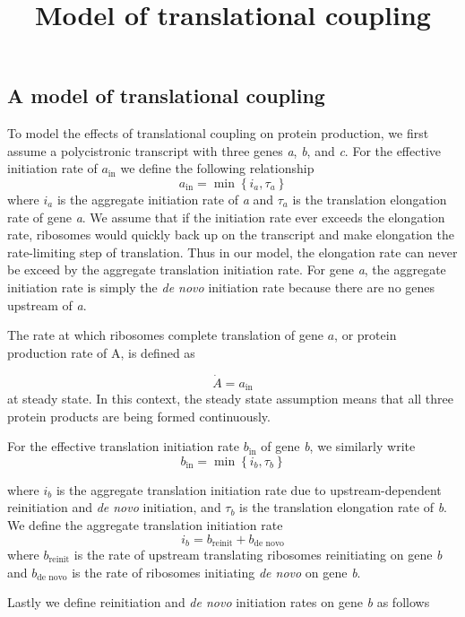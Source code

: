 \documentclass[]{article}
\title{Model of translational coupling}
\author{}
\date{}
\begin{document}
\maketitle

\subsection{A model of translational
coupling}\label{a-model-of-translational-coupling}

To model the effects of translational coupling on protein production, we
first assume a polycistronic transcript with three genes \emph{a},
\emph{b}, and \emph{c}. For the effective initiation rate of
\(a_\text{in}\) we define the following relationship
\[a_\text{in} = \min\left\{i_a, \tau_a\right\}\] where \(i_a\) is the
aggregate initiation rate of \emph{a} and \(\tau_a\) is the translation
elongation rate of gene \emph{a}. We assume that if the initiation rate
ever exceeds the elongation rate, ribosomes would quickly back up on the
transcript and make elongation the rate-limiting step of translation.
Thus in our model, the elongation rate can never be exceed by the
aggregate translation initiation rate. For gene \emph{a}, the aggregate
initiation rate is simply the \emph{de novo} initiation rate because
there are no genes upstream of \emph{a}.

The rate at which ribosomes complete translation of gene \(a\), or
protein production rate of A, is defined as

\[ \dot{A} = a_\text{in} \] at steady state. In this context, the steady
state assumption means that all three protein products are being formed
continuously.

For the effective translation initiation rate \(b_\text{in}\) of gene
\emph{b}, we similarly write
\[b_\text{in} = \min\left\{i_b, \tau_b\right\}\]

where \(i_b\) is the aggregate translation initiation rate due to
upstream-dependent reinitiation and \textit{de novo} initiation, and
\(\tau_b\) is the translation elongation rate of \emph{b}. We define the
aggregate translation initiation rate
\[i_b = b_\text{reinit} + b_\text{de novo}\] where \(b_\text{reinit}\)
is the rate of upstream translating ribosomes reinitiating on gene
\textit{b} and \(b_\text{de novo}\) is the rate of ribosomes initiating
\emph{de novo} on gene \emph{b}.

Lastly we define reinitiation and \emph{de novo} initiation rates on
gene \emph{b} as follows
\end{document}
